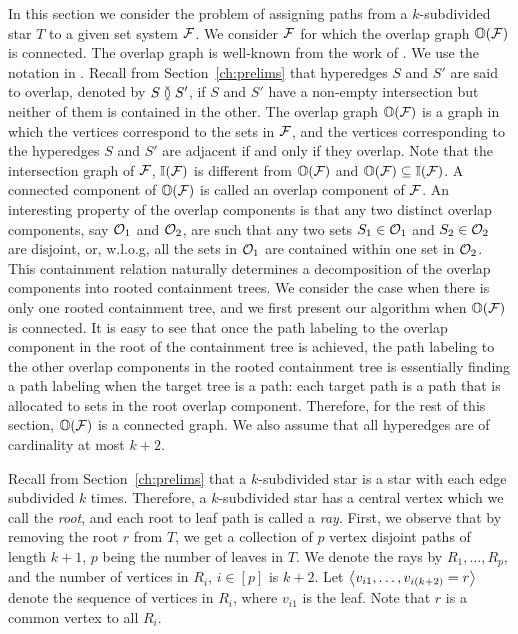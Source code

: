 \documentclass[MS]             %
              {iitmdiss_as}    %
\begin{document}
In this section we consider the problem of assigning paths from a
$k$-subdivided star $T$ to a given set system ${\cal F}$.  We consider
${\cal F}$ for which the overlap graph $\mathbb O({\cal F})$ is connected.  The
overlap graph is well-known from the work of
\cite{kklv10,nsnrs09,wlh02}.  We use the notation in
\cite{kklv10}. Recall from Section~\ref{ch:prelims} that hyperedges
$S$ and $S'$ are said to overlap, denoted by $S \between S'$, if $S$
and $S'$ have a non-empty intersection but neither of them is
contained in the other. The overlap graph $\mathbb O({\cal F})$ is a graph in
which the vertices correspond to the sets in ${\cal F}$, and the vertices
corresponding to the hyperedges $S$ and $S'$ are adjacent if and only
if they overlap.  Note that the intersection graph of ${\cal F}$,
$\mathbb I({\cal F})$ is different from $\mathbb O({\cal F})$ and $\mathbb O({\cal F}) \subseteq
\mathbb I({\cal F})$.  A connected component of $\mathbb O({\cal F})$ is called an overlap
component of ${\cal F}$.  An interesting property of the overlap components
is that any two distinct overlap components, say ${\cal O}_1$ and ${\cal O}_2$,
are such that any two sets $S_1 \in {\cal O}_1$ and $S_2 \in {\cal O}_2$ are
disjoint, or, w.l.o.g, all the sets in ${\cal O}_1$ are contained within
one set in ${\cal O}_2$.  This containment relation naturally determines a
decomposition of the overlap components into rooted containment trees.
We consider the case when there is only one rooted containment tree,
and we first present our algorithm when $\mathbb O({\cal F})$ is connected.  It
is easy to see that once the path labeling to the overlap component in
the root of the containment tree is achieved, the path labeling to the
other overlap components in the rooted containment tree is essentially
finding a path labeling when the target tree is a path: each target
path is a path that is allocated to sets in the root overlap
component.  Therefore, for the rest of this section, $\mathbb O({\cal F})$ is a
connected graph. We also assume that all hyperedges are of cardinality
at most $k+2$.

Recall from Section~\ref{ch:prelims} that a $k$-subdivided star is a
star with each edge subdivided $k$ times. Therefore, a $k$-subdivided
star has a central vertex which we call the {\em root}, and each root
to leaf path is called a {\em ray}. First, we observe that by removing
the root $r$ from $T$, we get a collection of $p$ vertex disjoint
paths of length $k+1$, $p$ being the number of leaves in $T$.  We
denote the rays by $R_1, \ldots, R_p$, and the number of vertices in
$R_i$, $i \in [p]$ is $k+2$.  Let $\left\langle v_{i1},\ldots,v_{i(k+2)}=r \right\rangle$
denote the sequence of vertices in $R_i$, where $v_{i1}$ is the
leaf. Note that $r$ is a common vertex to all $R_i$.
\end{document}
